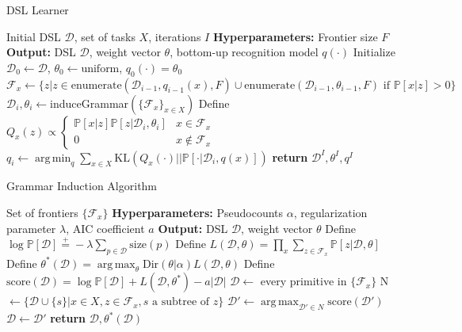 \documentclass{article}
\DeclareMathOperator*{\argmin}{arg\,min} %
\DeclareMathOperator*{\argmax}{arg\,max} %
\DeclareMathOperator{\argmin}{argmin} %
\newcommand{\probability}{\mathds{P}} %
\begin{document}
\begin{algorithm}[tb]
   \caption{DSL Learner}
   \label{mainAlgorithm}
   \begin{algorithmic}
      Initial DSL $\mathcal{D}$, set of tasks $X$, iterations $I$
     \STATE \textbf{Hyperparameters:} Frontier size $F$
     \STATE \textbf{Output:} DSL $\mathcal{D}$, weight vector $\theta$, bottom-up recognition model $q(\cdot)$
     \STATE Initialize $\mathcal{D}_0\gets \mathcal{D}$, $\theta_0\gets \text{uniform}$, $q_0(\cdot ) = \theta_0$
     \STATE  $\mathcal{F}_x\gets \{z| z\in \text{enumerate}(\mathcal{D}_{i - 1},q_{i - 1}(x),F)\cup\text{enumerate}(\mathcal{D}_{i - 1},\theta_{i - 1},F) \text{ if }\probability[x|z] > 0\}$
     \ENDFOR
     \STATE $\mathcal{D}_i,\theta_i\gets $induceGrammar$(\{\mathcal{F}_x\}_{x\in X})$
     \STATE Define $Q_x(z) \propto \begin{cases}
       \probability[x|z]\probability[z|\mathcal{D}_i,\theta_i]&x\in \mathcal{F}_x\\
       0&x\not \in \mathcal{F}_x
     \end{cases}$
     \STATE $q_i\gets \argmin_q \sum_{x\in X}\text{KL}(Q_x(\cdot )||\probability[\cdot |\mathcal{D}_i,q(x)])$
      \ENDFOR
 \STATE \textbf{return} $\mathcal{D}^I,\theta^I,q^I$
\end{algorithmic}
\end{algorithm}

\begin{algorithm}[tb]
   \caption{Grammar Induction Algorithm}
   \label{grammarInductionAlgorithm}
   \begin{algorithmic}
      Set of frontiers $\{\mathcal{F}_x\}$
     \STATE \textbf{Hyperparameters:} Pseudocounts $\alpha$, regularization parameter $\lambda$, AIC coefficient $a$
     \STATE \textbf{Output:} DSL $\mathcal{D}$, weight vector $\theta$
     \STATE Define $\log \probability[\mathcal{D}]\stackrel{+}{ = } -\lambda\sum_{p\in \mathcal{D}} \text{size}(p)$
     \STATE Define $L(\mathcal{D},\theta) =  \prod_x \sum_{z\in \mathcal{F}_x} \probability[z|\mathcal{D},\theta]$
     \STATE Define $\theta^*(\mathcal{D}) = \argmax_\theta \text{Dir}(\theta|\alpha) L(\mathcal{D},\theta)$
     \STATE Define $\text{score}(\mathcal{D}) = \log \probability[\mathcal{D}] + L(\mathcal{D},\theta^*) - a|\mathcal{D}|$
     \STATE $\mathcal{D}\gets$ every primitive in $\{\mathcal{F}_x\}$
     \STATE N $\gets \{\mathcal{D}\cup \{s\} | x\in X, z\in \mathcal{F}_x, s\text{ a subtree of }z\}$
     \STATE $\mathcal{D}'\gets \argmax_{\mathcal{D}'\in N}\text{score}(\mathcal{D}') $
     \STATE $\mathcal{D}\gets\mathcal{D}'$
     \ELSE
     \STATE\textbf{return} $\mathcal{D},\theta^*(\mathcal{D})$
     \ENDIF
     \ENDWHILE
   \end{algorithmic}
\end{algorithm}
\end{document}
